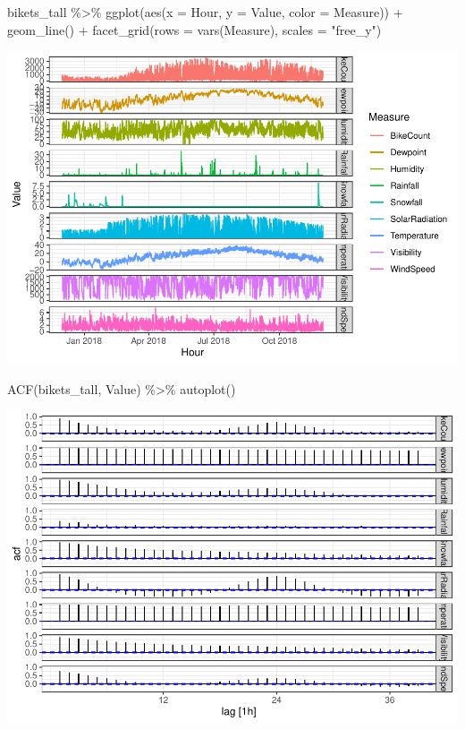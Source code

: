 \documentclass[
]{article}
\newenvironment{Shaded}{\begin{snugshade}}{\end{snugshade}}
\newcommand{\AttributeTok}[1]{\textcolor[rgb]{0.77,0.63,0.00}{#1}}
\newcommand{\FunctionTok}[1]{\textcolor[rgb]{0.00,0.00,0.00}{#1}}
\newcommand{\NormalTok}[1]{#1}
\newcommand{\SpecialCharTok}[1]{\textcolor[rgb]{0.00,0.00,0.00}{#1}}
\newcommand{\StringTok}[1]{\textcolor[rgb]{0.31,0.60,0.02}{#1}}
\begin{document}
\begin{Shaded}
\begin{Highlighting}[]
\NormalTok{bikets\_tall }\SpecialCharTok{\%\textgreater{}\%}
  \FunctionTok{ggplot}\NormalTok{(}\FunctionTok{aes}\NormalTok{(}\AttributeTok{x =}\NormalTok{ Hour, }\AttributeTok{y =}\NormalTok{ Value, }\AttributeTok{color =}\NormalTok{ Measure)) }\SpecialCharTok{+}
  \FunctionTok{geom\_line}\NormalTok{() }\SpecialCharTok{+}
  \FunctionTok{facet\_grid}\NormalTok{(}\AttributeTok{rows =} \FunctionTok{vars}\NormalTok{(Measure), }\AttributeTok{scales =} \StringTok{"free\_y"}\NormalTok{)}
\end{Highlighting}
\end{Shaded}

\includegraphics{BikeProject_files/figure-latex/ts-plots-3.pdf}

\begin{Shaded}
\begin{Highlighting}[]
\FunctionTok{ACF}\NormalTok{(bikets\_tall, Value) }\SpecialCharTok{\%\textgreater{}\%} \FunctionTok{autoplot}\NormalTok{()}
\end{Highlighting}
\end{Shaded}

\includegraphics{BikeProject_files/figure-latex/ts-plots-4.pdf}
\end{document}
